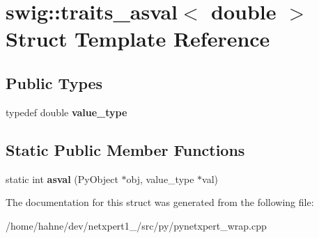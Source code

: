 \hypertarget{structswig_1_1traits__asval_3_01double_01_4}{}\section{swig\+:\+:traits\+\_\+asval$<$ double $>$ Struct Template Reference}
\label{structswig_1_1traits__asval_3_01double_01_4}
\subsection*{Public Types}
\begin{DoxyCompactItemize}
\item 
typedef double {\bfseries value\+\_\+type}\hypertarget{structswig_1_1traits__asval_3_01double_01_4_acc549718ce52880c4368a2e37f3ff544}{}\label{structswig_1_1traits__asval_3_01double_01_4_acc549718ce52880c4368a2e37f3ff544}

\end{DoxyCompactItemize}
\subsection*{Static Public Member Functions}
\begin{DoxyCompactItemize}
\item 
static int {\bfseries asval} (Py\+Object $\ast$obj, value\+\_\+type $\ast$val)\hypertarget{structswig_1_1traits__asval_3_01double_01_4_aa2b3a8491625ce70a1bb03c1cc851d9a}{}\label{structswig_1_1traits__asval_3_01double_01_4_aa2b3a8491625ce70a1bb03c1cc851d9a}

\end{DoxyCompactItemize}


The documentation for this struct was generated from the following file\+:\begin{DoxyCompactItemize}
\item 
/home/hahne/dev/netxpert1\+\_/src/py/pynetxpert\+\_\+wrap.\+cpp\end{DoxyCompactItemize}
